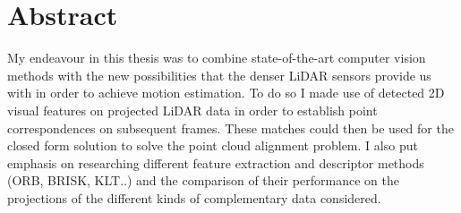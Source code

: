 \chapter{Abstract}



My endeavour in this thesis was to combine state-of-the-art computer vision methods 
with the new possibilities that the denser LiDAR sensors provide us with in order to achieve motion estimation. To do so I made use of detected 2D visual features on projected LiDAR data in order to establish point correspondences on subsequent frames. These matches could then be used for the closed form solution to solve the point cloud alignment problem.
I also put emphasis on researching different feature extraction and descriptor methods (ORB, BRISK, KLT..) and the comparison of their performance on the projections of the different kinds of complementary data considered.